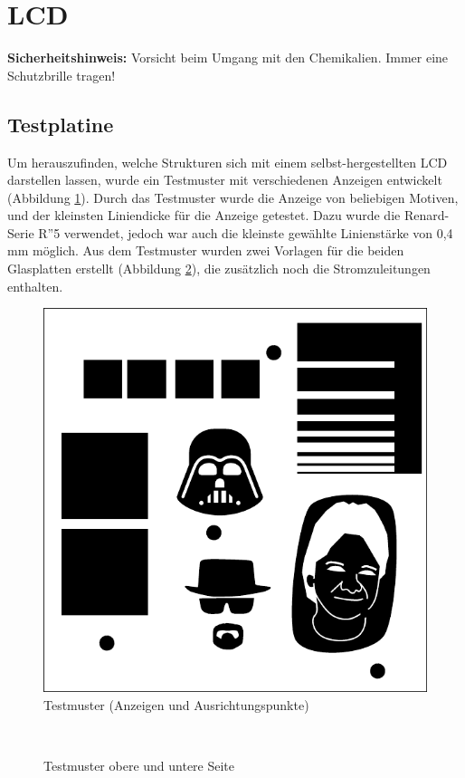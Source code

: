 \section{LCD}
\textbf{Sicherheitshinweis:} Vorsicht beim Umgang mit den Chemikalien. Immer eine Schutzbrille tragen!

\subsection{Testplatine}
Um herauszufinden, welche Strukturen sich mit einem selbst-hergestellten LCD darstellen lassen, wurde ein Testmuster mit verschiedenen Anzeigen entwickelt (Abbildung \ref{testmuster}).
Durch das Testmuster wurde die Anzeige von beliebigen Motiven, und der kleinsten Liniendicke für die Anzeige getestet.
Dazu wurde die Renard-Serie R''5 verwendet, jedoch war auch die kleinste gewählte Linienstärke von 0,4\,mm möglich.
Aus dem Testmuster wurden zwei Vorlagen für die beiden Glasplatten erstellt (Abbildung \ref{testmuster_seiten}), die zusätzlich noch die Stromzuleitungen enthalten.


\begin{figure}[t]
	\centering
	\includegraphics[width=0.5\linewidth, keepaspectratio]{Bilder/testmuster}
	\caption{Testmuster (Anzeigen und Ausrichtungspunkte)}
	\label{testmuster}
\end{figure}


\begin{figure}[t]
	\centering
	~
	\caption{Testmuster obere und untere Seite}
	\label{testmuster_seiten}
\end{figure}


